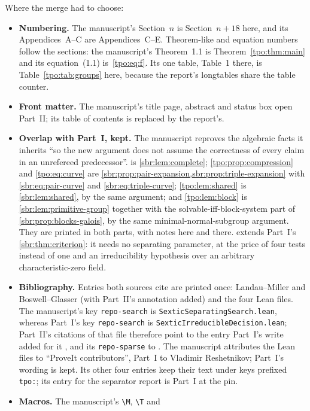 \documentclass[11pt,letterpaper]{article}
\numberwithin{equation}{section}
\theoremstyle{definition}
\theoremstyle{remark}
\newcommand{\src}[1]{\texttt{\nolinkurl{#1}}}
\begin{document}
Where the merge had to choose:
\begin{itemize}
\item \textbf{Numbering.} The manuscript's Section~$n$ is Section~$n+18$
here, and its Appendices~A--C are Appendices~C--E. Theorem-like and equation
numbers follow the sections: the manuscript's Theorem~1.1 is
Theorem~\ref{tpo:thm:main} and its equation~(1.1) is~\eqref{tpo:eq:f}. Its
one table, Table~1 there, is Table~\ref{tpo:tab:groups} here, because the
report's longtables share the table counter.
\item \textbf{Front matter.} The manuscript's title page, abstract and status
box open Part~II; its table of contents is replaced by the report's.
\item \textbf{Overlap with Part~I, kept.} The manuscript reproves the
algebraic facts it inherits ``so the new argument does not assume the
correctness of every claim in an unrefereed predecessor''. 
is \cref{sbr:lem:complete}; \cref{tpo:prop:compression} and \eqref{tpo:eq:curve}
are \cref{sbr:prop:pair-expansion,sbr:prop:triple-expansion} with
\eqref{sbr:eq:pair-curve} and \eqref{sbr:eq:triple-curve};
\cref{tpo:lem:shared} is \cref{sbr:lem:shared}, by the same argument; and
\cref{tpo:lem:block} is \cref{sbr:lem:primitive-group} together with the
solvable-iff-block-system part of \cref{sbr:prop:blocks-galois}, by the same
minimal-normal-subgroup argument. They are printed in both parts, with
notes here and there.  extends Part~I's
\cref{sbr:thm:criterion}: it needs no separating parameter, at the price of
four tests instead of one and an irreducibility hypothesis over an arbitrary
characteristic-zero field.
\item \textbf{Bibliography.} Entries both sources cite are printed once:
Landau--Miller and Boswell--Glasser (with Part~II's annotation added) and
the four Lean files. The manuscript's key \src{repo-search} is
\src{SexticSeparatingSearch.lean}, whereas Part~I's key \src{repo-search}
is \src{SexticIrreducibleDecision.lean}; Part~II's citations of that file
therefore point to the entry Part~I's write added for it
\cite{repo-separating-search}, and its \src{repo-sparse} to
\cite{repo-sparse-search}. The manuscript attributes the Lean files to
``ProveIt contributors'', Part~I to Vladimir Reshetnikov; Part~I's wording is
kept. Its other four entries keep their text under keys prefixed
\src{tpo:}; its entry for the separator report is Part~I at the pin.
\item \textbf{Macros.} The manuscript's \verb|\M|, \verb|\T| and

\end{itemize}
\end{document}
